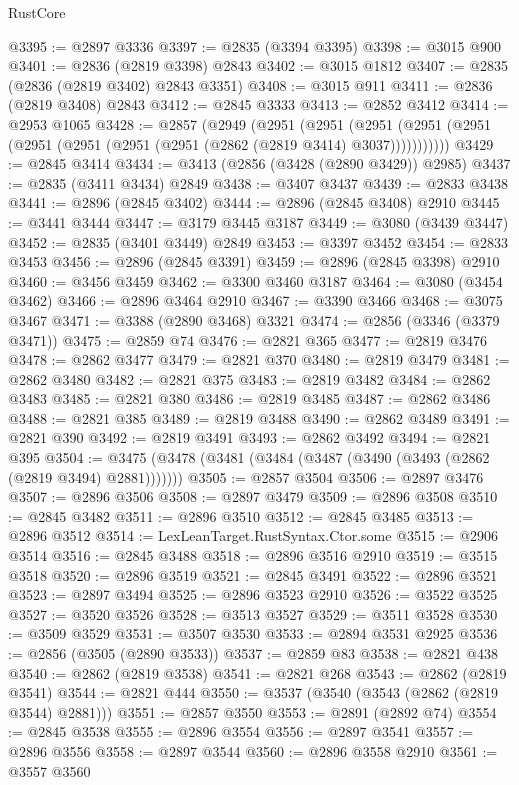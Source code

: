 \begin{lexlean}{RustCore}
\begin{coremodule}
@3395 := @2897 @3336
@3397 := @2835 (@3394 @3395)
@3398 := @3015 @900
@3401 := @2836 (@2819 @3398) @2843
@3402 := @3015 @1812
@3407 := @2835 (@2836 (@2819 @3402) @2843 @3351)
@3408 := @3015 @911
@3411 := @2836 (@2819 @3408) @2843
@3412 := @2845 @3333
@3413 := @2852 @3412
@3414 := @2953 @1065
@3428 := @2857
    (@2949
      (@2951
        (@2951
          (@2951 (@2951 (@2951 (@2951 (@2951 (@2951 (@2951 (@2862 (@2819 @3414) @3037)))))))))))
@3429 := @2845 @3414
@3434 := @3413 (@2856 (@3428 (@2890 @3429)) @2985)
@3437 := @2835 (@3411 @3434) @2849
@3438 := @3407 @3437
@3439 := @2833 @3438
@3441 := @2896 (@2845 @3402)
@3444 := @2896 (@2845 @3408) @2910
@3445 := @3441 @3444
@3447 := @3179 @3445 @3187
@3449 := @3080 (@3439 @3447)
@3452 := @2835 (@3401 @3449) @2849
@3453 := @3397 @3452
@3454 := @2833 @3453
@3456 := @2896 (@2845 @3391)
@3459 := @2896 (@2845 @3398) @2910
@3460 := @3456 @3459
@3462 := @3300 @3460 @3187
@3464 := @3080 (@3454 @3462)
@3466 := @2896 @3464 @2910
@3467 := @3390 @3466
@3468 := @3075 @3467
@3471 := @3388 (@2890 @3468) @3321
@3474 := @2856 (@3346 (@3379 @3471))
@3475 := @2859 @74
@3476 := @2821 @365
@3477 := @2819 @3476
@3478 := @2862 @3477
@3479 := @2821 @370
@3480 := @2819 @3479
@3481 := @2862 @3480
@3482 := @2821 @375
@3483 := @2819 @3482
@3484 := @2862 @3483
@3485 := @2821 @380
@3486 := @2819 @3485
@3487 := @2862 @3486
@3488 := @2821 @385
@3489 := @2819 @3488
@3490 := @2862 @3489
@3491 := @2821 @390
@3492 := @2819 @3491
@3493 := @2862 @3492
@3494 := @2821 @395
@3504 := @3475 (@3478 (@3481 (@3484 (@3487 (@3490 (@3493 (@2862 (@2819 @3494) @2881)))))))
@3505 := @2857 @3504
@3506 := @2897 @3476
@3507 := @2896 @3506
@3508 := @2897 @3479
@3509 := @2896 @3508
@3510 := @2845 @3482
@3511 := @2896 @3510
@3512 := @2845 @3485
@3513 := @2896 @3512
@3514 := LexLeanTarget.RustSyntax.Ctor.some
@3515 := @2906 @3514
@3516 := @2845 @3488
@3518 := @2896 @3516 @2910
@3519 := @3515 @3518
@3520 := @2896 @3519
@3521 := @2845 @3491
@3522 := @2896 @3521
@3523 := @2897 @3494
@3525 := @2896 @3523 @2910
@3526 := @3522 @3525
@3527 := @3520 @3526
@3528 := @3513 @3527
@3529 := @3511 @3528
@3530 := @3509 @3529
@3531 := @3507 @3530
@3533 := @2894 @3531 @2925
@3536 := @2856 (@3505 (@2890 @3533))
@3537 := @2859 @83
@3538 := @2821 @438
@3540 := @2862 (@2819 @3538)
@3541 := @2821 @268
@3543 := @2862 (@2819 @3541)
@3544 := @2821 @444
@3550 := @3537 (@3540 (@3543 (@2862 (@2819 @3544) @2881)))
@3551 := @2857 @3550
@3553 := @2891 (@2892 @74)
@3554 := @2845 @3538
@3555 := @2896 @3554
@3556 := @2897 @3541
@3557 := @2896 @3556
@3558 := @2897 @3544
@3560 := @2896 @3558 @2910
@3561 := @3557 @3560

\end{coremodule}
\end{lexlean}
